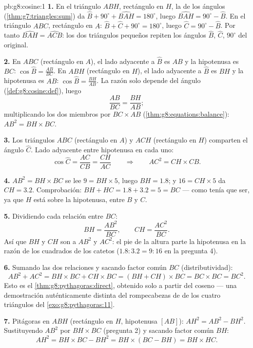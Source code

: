 \begin{solution}{pb:g8:cosine:1}
\textbf{1.} En el triángulo $ABH$, rectángulo en $H$, la 
de los ángulos (\cref{thm:g7:triangles:sum}) da
$\widehat B + 90^\circ + \widehat{BAH} = 180^\circ$, luego
$\widehat{BAH} = 90^\circ - \widehat B$. En el triángulo $ABC$,
rectángulo en $A$:
$\widehat B + \widehat C + 90^\circ = 180^\circ$, luego
$\widehat C = 90^\circ - \widehat B$. Por tanto
$\widehat{BAH} = \widehat{ACB}$: los dos triángulos pequeños repiten los
ángulos $\widehat B$, $\widehat C$, $90^\circ$ del original.

\textbf{2.} En $ABC$ (rectángulo en $A$), el lado adyacente a
$\widehat B$ es $AB$ y la hipotenusa es $BC$:
$\cos\widehat B = \frac{AB}{BC}$. En $ABH$ (rectángulo en $H$),
el lado adyacente a $\widehat B$ es $BH$ y la hipotenusa es
$AB$: $\cos\widehat B = \frac{BH}{AB}$. La razón solo depende del
ángulo (\cref{def:g8:cosine:def}), luego
\[
\frac{AB}{BC} = \frac{BH}{AB} ;
\]
multiplicando los dos miembros por $BC \times AB$
(\cref{thm:g8:equations:balance}):
$AB^2 = BH \times BC$.

\textbf{3.} Los triángulos $ABC$ (rectángulo en $A$) y $ACH$
(rectángulo en $H$) comparten el ángulo $\widehat C$. Lado adyacente
entre hipotenusa en cada uno:
\[
\cos\widehat C = \frac{AC}{CB} = \frac{CH}{AC}
\qquad\Longrightarrow\qquad
AC^2 = CH \times CB .
\]

\textbf{4.} $AB^2 = BH \times BC$ se lee $9 = BH \times 5$, luego
$BH = 1.8$; y $16 = CH \times 5$ da $CH = 3.2$. Comprobación:
$BH + HC = 1.8 + 3.2 = 5 = BC$ --- como tenía que ser, ya que $H$ está sobre
la hipotenusa, entre $B$ y $C$.

\textbf{5.} Dividiendo cada relación entre $BC$:
\[
BH = \frac{AB^2}{BC},
\qquad
CH = \frac{AC^2}{BC} .
\]
Así que $BH$ y $CH$ son  a $AB^2$ y $AC^2$: el pie
de la altura parte la hipotenusa en la razón de los cuadrados
de los catetos ($1.8 : 3.2 = 9 : 16$ en la pregunta 4).

\textbf{6.} Sumando las dos relaciones y sacando factor común $BC$
(distributividad):
\[
AB^2 + AC^2 = BH \times BC + CH \times BC
= (BH + CH) \times BC = BC \times BC = BC^2 .
\]
Esto es el \cref{thm:g8:pythagoras:direct}, obtenido solo a partir del coseno
--- una demostración auténticamente distinta del rompecabezas de 
de los cuatro triángulos del \cref{exo:g8:pythagoras:11}.

\textbf{7.} Pitágoras en $ABH$ (rectángulo en $H$, hipotenusa
$[AB]$): $AH^2 = AB^2 - BH^2$. Sustituyendo $AB^2$ por
$BH \times BC$ (pregunta 2) y sacando factor común $BH$:
\[
AH^2 = BH \times BC - BH^2
= BH \times (BC - BH)
= BH \times HC .
\]


\end{solution}
